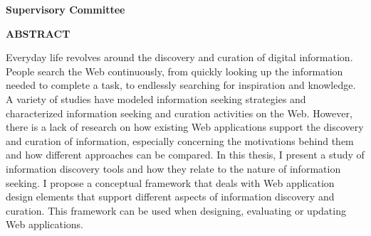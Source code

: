 \newpage
{}

\noindent \textbf{Supervisory Committee}
\tpbreak
\panel

\begin{center}
\textbf{ABSTRACT}
\end{center}

Everyday life revolves around the discovery and curation of digital information. People search the Web continuously, from quickly looking up the information needed to complete a task, to endlessly searching for inspiration and knowledge. A variety of studies have modeled information seeking strategies and characterized information seeking and curation activities on the Web. However, there is a lack of research on how existing Web applications support the discovery and curation of information, especially concerning the motivations behind them and how different approaches can be compared. In this thesis, I present a study of information discovery tools and how they relate to the nature of information seeking. I propose a conceptual framework that deals with Web application design elements that support different aspects of information discovery and curation. This framework can be used when designing, evaluating or updating Web applications.